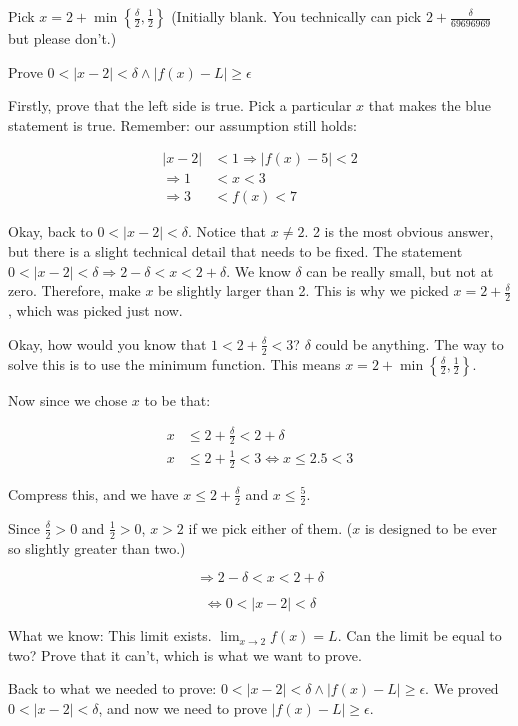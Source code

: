 \documentclass[
]{article}
\begin{document}
Pick $x = 2 + \min\left\{ \frac{\delta}{2},\frac{1}{2} \right\}$
(Initially blank. You technically can pick
$2 + \frac{\delta}{69696969}$ but please don't.)

Prove
$0 < |x - 2| < \delta \land \left| f(x) - L \right| \geq \epsilon$

Firstly, prove that the left side is true. Pick a particular $x$ that
makes the blue statement is true. Remember: our assumption still holds:

\begin{align*}
|x - 2| &< 1 \Rightarrow \left| f(x) - 5 \right| < 2
 \\
\Rightarrow 1 &< x < 3
 \\
\Rightarrow 3 &< f(x) < 7
\end{align*}


Okay, back to $0 < |x - 2| < \delta$. Notice that $x \neq 2$. 2 is
the most obvious answer, but there is a slight technical detail that
needs to be fixed. The statement
$0 < |x - 2| < \delta \Rightarrow 2 - \delta < x < 2 + \delta$. We
know $\delta$ can be really small, but not at zero. Therefore, make
$x$ be slightly larger than 2. This is why we picked
$x = 2 + \frac{\delta}{2}$, which was picked just now.

Okay, how would you know that $1 < 2 + \frac{\delta}{2} < 3$?
$\delta$ could be anything. The way to solve this is to use the
minimum function. This means
$x = 2 + \min\left\{ \frac{\delta}{2},\frac{1}{2} \right\}$.

Now since we chose $x$ to be that:

\begin{align*}
x &\leq 2 + \frac{\delta}{2} < 2 + \delta
 \\
x &\leq 2 + \frac{1}{2} < 3 \Leftrightarrow x \leq 2.5 < 3
\end{align*}


Compress this, and we have $x \leq 2 + \frac{\delta}{2}$ and
$x \leq \frac{5}{2}$.

Since $\frac{\delta}{2} > 0$ and $\frac{1}{2} > 0$, $x > 2$ if we
pick either of them. ($x$ is designed to be ever so slightly greater
than two.)

$$\Rightarrow 2 - \delta < x < 2 + \delta$$

$$\Leftrightarrow 0 < |x - 2| < \delta$$

What we know: This limit exists. $\lim_{x \rightarrow 2}{f(x) = L}$.
Can the limit be equal to two? Prove that it can't, which is what we
want to prove.

Back to what we needed to prove:
$0 < |x - 2| < \delta \land \left| f(x) - L \right| \geq \epsilon$. We
proved $0 < |x - 2| < \delta$, and now we need to prove
$\left| f(x) - L \right| \geq \epsilon$.
\end{document}
